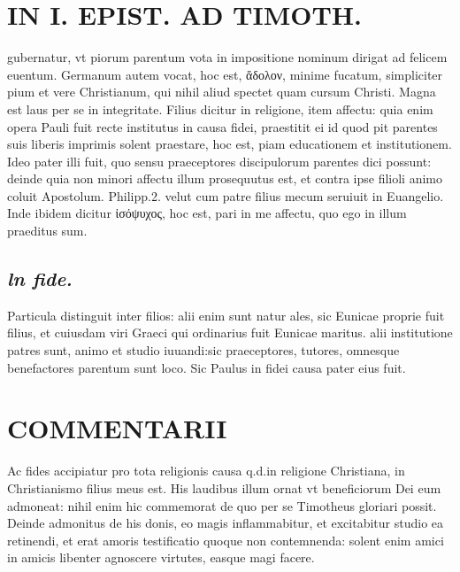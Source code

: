\documentclass{article}
\begin{document}
\begin{pages}
\section*{IN I. EPIST. AD TIMOTH. }
\marginpar{[ p.13 ]}\pstart gubernatur, vt piorum parentum vota in impositione nominum dirigat ad felicem euentum.  \pend\pstart Germanum autem vocat, hoc est, ἄδολον, minime fucatum, simpliciter pium et vere Christianum, qui nihil aliud spectet quam cursum Christi. Magna est laus per se in integritate.  \pend\pstart Filius dicitur in religione, item affectu: quia enim opera Pauli fuit recte institutus in causa fidei, praestitit ei id quod pit parentes suis liberis imprimis solent praestare, hoc est, piam educationem et institutionem. Ideo pater illi fuit, quo sensu praeceptores discipulorum parentes dici possunt: deinde quia non minori affectu illum prosequutus est, et contra ipse filioli animo coluit Apostolum. Philipp.2. velut cum patre filius mecum seruiuit in Euangelio. Inde ibidem dicitur ἰσόψυχος, hoc est, pari in me affectu, quo ego in illum praeditus sum.  \pend
{}
{}
\subsection*{\textit{ln fide. }}\pstart Particula distinguit inter filios: alii enim sunt natur ales, sic Eunicae proprie fuit filius, et cuiusdam viri Graeci qui ordinarius fuit Eunicae maritus. alii institutione patres sunt, animo et studio iuuandi:sic praeceptores, tutores, omnesque benefactores parentum sunt loco. Sic Paulus in fidei causa pater eius fuit.  \pend
\section*{COMMENTARII }
\marginpar{[ p.14 ]}\pstart Ac fides accipiatur pro tota religionis causa q.d.in religione Christiana, in Christianismo filius meus est.  \pend\pstart His laudibus illum ornat vt beneficiorum Dei eum admoneat: nihil enim hic commemorat de quo per se Timotheus gloriari possit. Deinde admonitus de his donis, eo magis inflammabitur, et excitabitur studio ea retinendi, et erat amoris testificatio quoque non contemnenda: solent enim amici in amicis libenter agnoscere virtutes, easque magi facere.  \pend
{}
{}

\end{pages}
\end{document}
